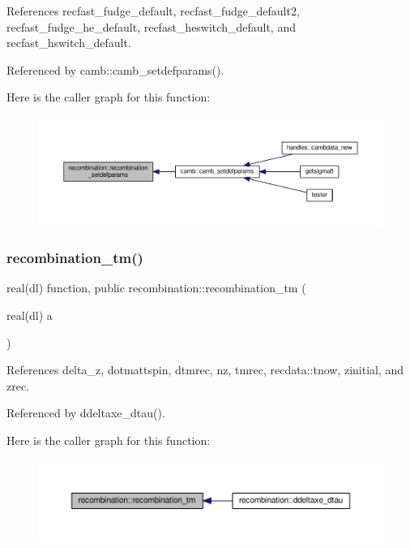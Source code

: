 References recfast\+\_\+fudge\+\_\+default, recfast\+\_\+fudge\+\_\+default2, recfast\+\_\+fudge\+\_\+he\+\_\+default, recfast\+\_\+heswitch\+\_\+default, and recfast\+\_\+hswitch\+\_\+default.



Referenced by camb\+::camb\+\_\+setdefparams().

Here is the caller graph for this function\+:
\nopagebreak
\begin{figure}[H]
\begin{center}
\leavevmode
\includegraphics[width=350pt]{namespacerecombination_aafff8339a994ad18b5b4187d9d4faa40_icgraph}
\end{center}
\end{figure}
\mbox{\label{namespacerecombination_a8d7b99ebe97a13f83da41d8d9b8215e2}} 
\subsubsection{\texorpdfstring{recombination\+\_\+tm()}{recombination\_tm()}}
{\footnotesize\ttfamily real(dl) function, public recombination\+::recombination\+\_\+tm (\begin{DoxyParamCaption}\item[{real(dl)}]{a }\end{DoxyParamCaption})}



References delta\+\_\+z, dotmattspin, dtmrec, nz, tmrec, recdata\+::tnow, zinitial, and zrec.



Referenced by ddeltaxe\+\_\+dtau().

Here is the caller graph for this function\+:
\nopagebreak
\begin{figure}[H]
\begin{center}
\leavevmode
\includegraphics[width=350pt]{namespacerecombination_a8d7b99ebe97a13f83da41d8d9b8215e2_icgraph}
\end{center}
\end{figure}
\mbox{\label{namespacerecombination_ae89b19e4ef4ab84e9724ee4a4d2435fc}} 
